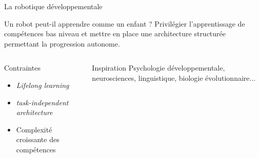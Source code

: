 \documentclass[xcolor=pst,dvips,12pt,english,french]{beamer}
\begin{document}
	\begin{frame}{La robotique développementale}
		\begin{block}{Un robot peut-il apprendre comme un enfant ?}
			 Privilégier l'apprentissage de compétences bas niveau et mettre en place une architecture structurée permettant la progression autonome.
		\end{block}
		\begin{columns}
			\begin{column}{0.45\textwidth}
				\begin{exampleblock}{Contraintes}
					\begin{itemize}
						\item \emph{Lifelong learning}
						\item \emph{task-independent architecture}
						\item Complexité croissante des compétences
					\end{itemize}
				\end{exampleblock}
			\end{column}
			\begin{column}{0.45\textwidth}
				\begin{exampleblock}{Inspiration}
					Psychologie développementale, neurosciences, linguistique, biologie évolutionnaire...
				\end{exampleblock}
			\end{column}
		\end{columns}
	\end{frame}
	
\end{document}
